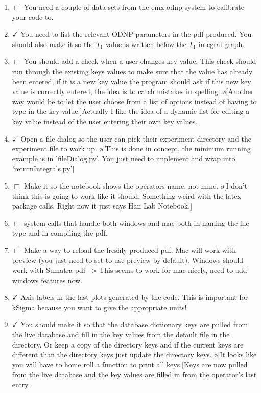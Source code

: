 \documentclass[10pt]{book}
\begin{document}
\begin{enumerate}
    \item $\Box$ You need a couple of data sets from the emx odnp system to calibrate your code to.
    \item $\checkmark$ You need to list the relevant ODNP parameters in the pdf produced. You should also make it so the $T_1$ value is written below the $T_1$ integral graph.
    \item $\Box$ You should add a check when a user changes key value. This check should run through the existing keys values to make sure that the value has already been entered, if it is a new key value the program should ask if this new key value is correctly entered, the idea is to catch mistakes in spelling. \o[Another way would be to let the user choose from a list of options instead of having to type in the key value.]{Actually I like the idea of a dynamic list for editing a key value instead of the user entering their own key values.}
    \item $\checkmark$ Open a file dialog so the user can pick their experiment directory and the experiment file to work up. \o[This is done in concept, the minimum running example is in 'fileDialog.py'. You just need to implement and wrap into 'returnIntegrals.py']{}
    \item $\Box$ Make it so the notebook shows the operators name, not mine. \o[I don't think this is going to work like it should. Something weird with the latex package calls. Right now it just says Han Lab Notebook.]{}
    \item $\Box$ system calls that handle both windows and mac both in naming the file type and in compiling the pdf.
    \item $\Box$ Make a way to reload the freshly produced pdf. Mac will work with preview (you just need to set to use preview by default). Windows should work with Sumatra pdf --> This seems to work for mac nicely, need to add windows features now.
    \item $\checkmark$ Axis labels in the last plots generated by the code. This is important for kSigma because you want to give the appropriate units!
    \item $\checkmark$ You should make it so that the database dictionary keys are pulled from the live database and fill in the key values from the default file in the directory. Or keep a copy of the directory keys and if the current keys are different than the directory keys just update the directory keys. \o[It looks like you will have to home roll a function to print all keys.]{Keys are now pulled from the live database and the key values are filled in from the operator's last entry.}

\end{enumerate}
\end{document}
